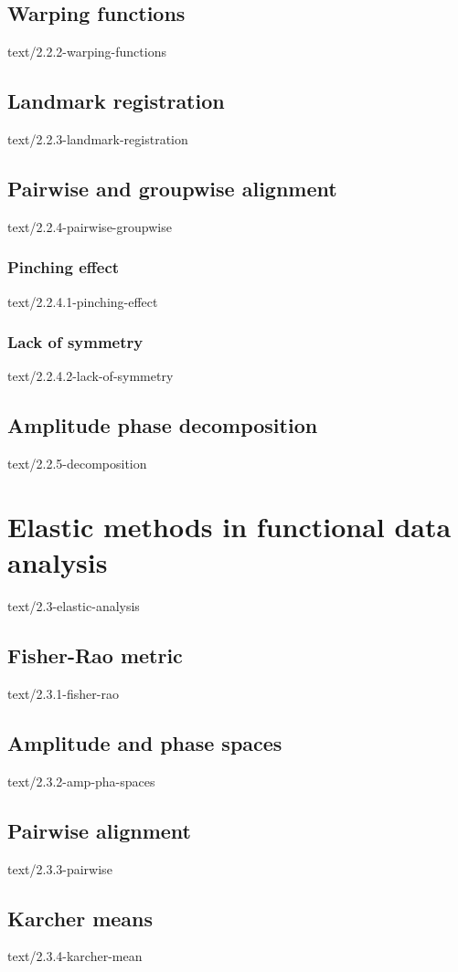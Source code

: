 \documentclass[epsbased,copyleft,final,loe, lof,extendedindex,firstnumbered,tfg,english]{tfgtfmthesisuam}
\begin{document}
  \subsection{Warping functions\label{SEC:WARPING}}{text/2.2.2-warping-functions}
  \subsection{Landmark registration\label{SEC:LANDMARK}}{text/2.2.3-landmark-registration}
  \subsection{Pairwise and groupwise alignment\label{SEC:L2PAIRWISE}}{text/2.2.4-pairwise-groupwise}
    \subsubsection{Pinching effect\label{SSEC:PINCHING}}{text/2.2.4.1-pinching-effect}
    \subsubsection{Lack of symmetry\label{SSEC:SIMMETRY}}{text/2.2.4.2-lack-of-symmetry}
  \subsection{Amplitude phase decomposition\label{SEC:DECOMPOSITION}}{text/2.2.5-decomposition}

\section{Elastic methods in functional data analysis\label{SEC:ELASTIC}}{text/2.3-elastic-analysis}
  \subsection{Fisher-Rao metric\label{SEC:FISHERRAO}}{text/2.3.1-fisher-rao}
  \subsection{Amplitude and phase spaces\label{SEC:AMPPHA}}{text/2.3.2-amp-pha-spaces}
  \subsection{Pairwise alignment\label{SEC:PAIRWISE}}{text/2.3.3-pairwise}
  \subsection{Karcher means\label{SEC:KARCHER}}{text/2.3.4-karcher-mean}
\end{document}
